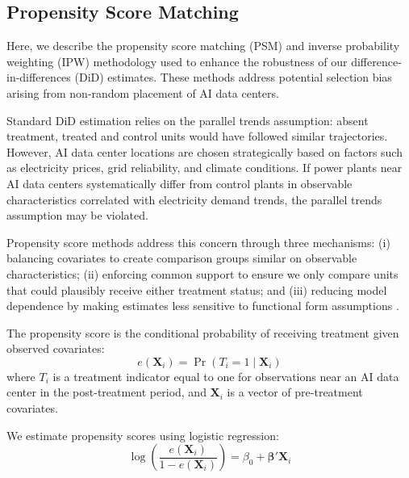 \documentclass[a4paper,fleqn,longmktitle]{cas-sc}
\theoremstyle{plain}
\theoremstyle{definition}
\begin{document}

\subsection{Propensity Score Matching}\label{APP:PSM}

Here, we describe the propensity score matching (PSM) and inverse probability weighting (IPW) methodology used to enhance the robustness of our difference-in-differences (DiD) estimates. These methods address potential selection bias arising from non-random placement of AI data centers.

Standard DiD estimation relies on the parallel trends assumption: absent treatment, treated and control units would have followed similar trajectories. However, AI data center locations are chosen strategically based on factors such as electricity prices, grid reliability, and climate conditions. If power plants near AI data centers systematically differ from control plants in observable characteristics correlated with electricity demand trends, the parallel trends assumption may be violated.

Propensity score methods address this concern through three mechanisms: (i) balancing covariates to create comparison groups similar on observable characteristics; (ii) enforcing common support to ensure we only compare units that could plausibly receive either treatment status; and (iii) reducing model dependence by making estimates less sensitive to functional form assumptions \citep{rosenbaum1983central, hirano2003efficient}.

The propensity score is the conditional probability of receiving treatment given observed covariates:
\begin{equation}
    e(\mathbf{X}_i) = \Pr(T_i = 1 \mid \mathbf{X}_i)
\end{equation}
where $T_i$ is a treatment indicator equal to one for observations near an AI data center in the post-treatment period, and $\mathbf{X}_i$ is a vector of pre-treatment covariates.

We estimate propensity scores using logistic regression:
\begin{equation}
    \log\left(\frac{e(\mathbf{X}_i)}{1 - e(\mathbf{X}_i)}\right) = \beta_0 + \boldsymbol{\beta}'\mathbf{X}_i
\end{equation}
\end{document}
